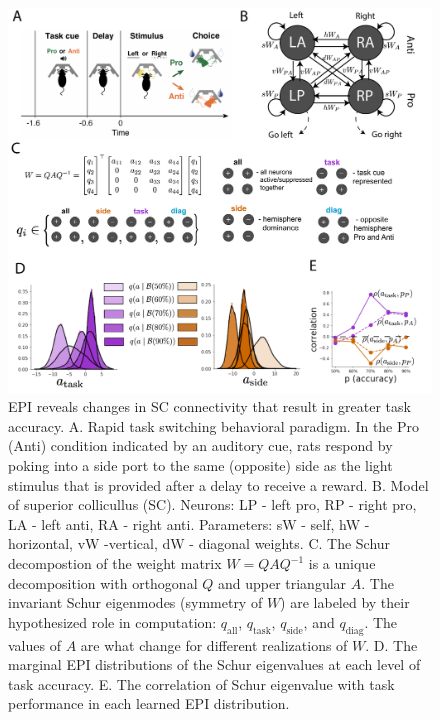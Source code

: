 \documentclass[11pt]{article}
\begin{document}
\begin{figure}
\begin{center}
\includegraphics[scale=0.5]{figures/fig4/fig4.pdf}
\end{center}
\caption{EPI reveals changes in SC \cite{duan2018collicular} connectivity that result in greater task accuracy.  A. Rapid task switching behavioral paradigm. In the Pro (Anti) condition indicated by an auditory cue,  rats respond by poking into a side port to the same (opposite) side as the light stimulus that is provided after a delay to receive a reward. B. Model of superior collicullus (SC). Neurons: LP - left pro, RP - right pro, LA - left anti, RA - right anti.  Parameters: sW - self, hW - horizontal, vW -vertical, dW - diagonal weights. C. The Schur decompostion of the weight matrix $W = QAQ^{-1}$ is a unique decomposition with orthogonal $Q$ and upper triangular $A$. The invariant Schur eigenmodes (symmetry of $W$) are labeled by their hypothesized role in computation: $q_{\text{all}}$, $q_{\text{task}}$, $q_{\text{side}}$, and $q_{\text{diag}}$.  The values of $A$ are what change for different realizations of $W$. D. The marginal EPI distributions of the Schur eigenvalues at each level of task accuracy. E. The correlation of Schur eigenvalue with task performance in each learned EPI distribution.}
\end{figure}
\end{document}
